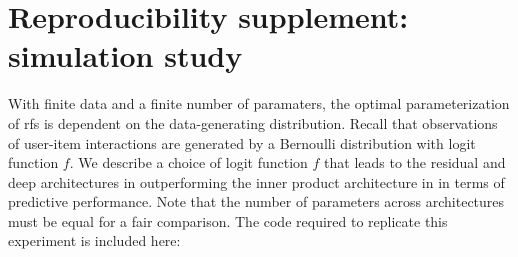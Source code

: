
\section{Reproducibility supplement: simulation study}
\label{sec:simulation}

With finite data and a finite number of paramaters, the optimal parameterization
of \gls{rfs} is dependent on the data-generating distribution. Recall that
observations of user-item interactions are generated by a Bernoulli distribution
with logit function $f$. We describe a choice of logit function $f$ that leads
to the residual and deep architectures in 
outperforming the inner product architecture in  in terms
of predictive performance. Note that the number of parameters across
architectures must be equal for a fair comparison. The code required to
replicate this experiment is included here:

